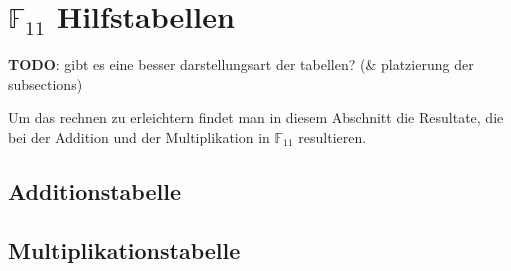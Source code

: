 %
%
%
\section{$\mathbb{F}_{11}$ Hilfstabellen
	\label{reedsolomon:section:hilfstabellen}}

\textbf{TODO}: gibt es eine besser darstellungsart der tabellen? (\& platzierung der subsections)

Um das rechnen  zu erleichtern findet man in diesem Abschnitt die Resultate, die bei der Addition und der Multiplikation in $\mathbb{F}_{11}$ resultieren.

\subsection{Additionstabelle
	\label{reedsolomon:subsection:adtab}}	


\subsection{Multiplikationstabelle
	\label{reedsolomon:subsection:mptab}}
